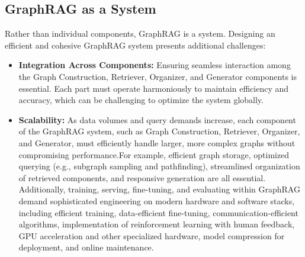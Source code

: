 \subsection{GraphRAG as a System} Rather than individual components, GraphRAG is a system. Designing an efficient and cohesive GraphRAG system presents additional challenges: \\
\begin{itemize}[leftmargin=*]
    \item \textbf{Integration Across Components:} Ensuring seamless interaction among the Graph Construction, Retriever, Organizer, and Generator components is essential. Each part must operate harmoniously to maintain efficiency and accuracy, which can be challenging to optimize the system globally. \\
    \item \textbf{Scalability:} As data volumes and query demands increase, each component of the GraphRAG system, such as Graph Construction, Retriever, Organizer, and Generator, must efficiently handle larger, more complex graphs without compromising performance.For example, efficient graph storage, optimized querying (e.g., subgraph sampling and pathfinding), streamlined organization of retrieved components, and responsive generation are all essential. Additionally, training, serving, fine-tuning, and evaluating within GraphRAG demand sophisticated engineering on modern hardware and software stacks, including efficient training, data-efficient fine-tuning, communication-efficient algorithms, implementation of reinforcement learning with human feedback, GPU acceleration and other specialized hardware, model compression for deployment, and online maintenance. \\

\end{itemize}
